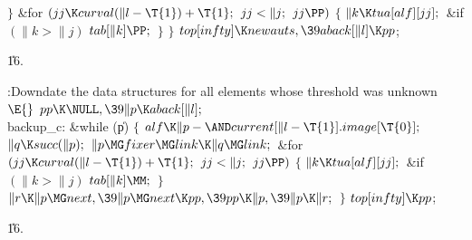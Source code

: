 \4${}\}{}$\2\6
\&{for} ${}(\\{jj}\K\\{curval}(\|l-\T{1})+\T{1};{}$ ${}\\{jj}<\|j;{}$ ${}\\{jj}%
\PP){}$\5
${}\{{}$\1\6
${}\|k\K\\{tua}[\\{alf}][\\{jj}];{}$\6
\&{if} ${}(\|k>\|j){}$\1\5
${}\\{tab}[\|k]\PP;{}$\2\6
\4${}\}{}$\2\6
\4${}\}{}$\2\6
${}\\{top}[\\{infty}]\K\\{newauts},\39\\{aback}[\|l]\K\\{pp}{}$;\par
\U16.\fi

\B{}:Downdate the data structures for all elements whose
threshold was unknown\X${}\E{}$\6
$\\{pp}\K\NULL,\39\|p\K\\{aback}[\|l];{}$\6
\4\\{backup\_c}:\5
\&{while} (\|p)\5
${}\{{}$\1\6
${}\\{alf}\K\|p-{\AND}\\{current}[\|l-\T{1}].\\{image}[\T{0}];{}$\6
${}\|q\K\\{succ}(\|p);{}$\6
${}\|p\MG\\{fixer}\MG\\{link}\K\|q\MG\\{link};{}$\6
\&{for} ${}(\\{jj}\K\\{curval}(\|l-\T{1})+\T{1};{}$ ${}\\{jj}<\|j;{}$ ${}\\{jj}%
\PP){}$\5
${}\{{}$\1\6
${}\|k\K\\{tua}[\\{alf}][\\{jj}];{}$\6
\&{if} ${}(\|k>\|j){}$\1\5
${}\\{tab}[\|k]\MM;{}$\2\6
\4${}\}{}$\2\6
${}\|r\K\|p\MG\\{next},\39\|p\MG\\{next}\K\\{pp},\39\\{pp}\K\|p,\39\|p\K\|r;{}$%
\6
\4${}\}{}$\2\6
${}\\{top}[\\{infty}]\K\\{pp}{}$;\par
\U16.\fi

